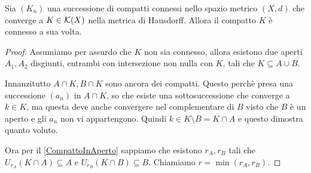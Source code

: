 \begin{theorem}
	Sia $(K_n)$ una successione di compatti connessi nello spazio metrico $(X,d)$ che converge a $K\in\mathcal{K}(X)$ nella metrica di Hausdorff. Allora il compatto $K$ è connesso a sua volta.
\end{theorem}
\begin{proof}
	Assumiamo per assurdo che $K$ non sia connesso, allora esistono due aperti $A_1,A_2$ disgiunti, entrambi con intersezione non nulla con $K$, tali che $K\subseteq A\cup B$.
	
	Innanzitutto $A\cap K, B\cap K$ sono ancora dei compatti. Questo perchè presa una successione $(a_n)$ in $A\cap K$, so che esiste una sottosuccessione che converge a $k\in K$, ma questa deve anche convergere nel complementare di $B$ visto che $B$ è un aperto e gli $a_n$ non vi appartengono. Quindi $k\in K\setminus B = K\cap A$ e questo dimostra quanto voluto.
	
	Ora per il \cref{CompattoInAperto} sappiamo che esistono $r_A,r_B$ tali che $U_{r_A}(K\cap A)\subseteq A$ e $U_{r_B}(K\cap B)\subseteq B$. Chiamiamo $r=\min(r_A,r_B)$.
\end{proof}



